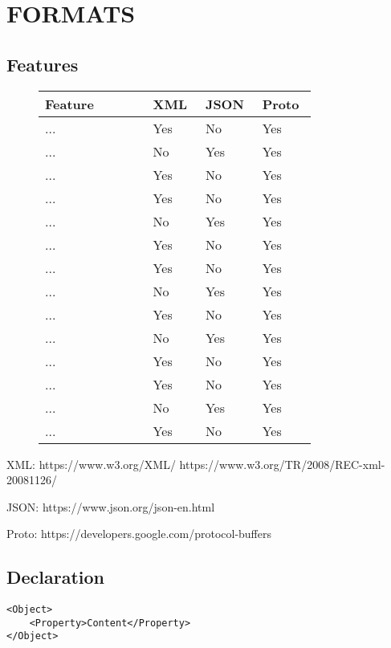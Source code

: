 \documentclass[../report.tex]{subfiles}
\begin{document}
\section{FORMATS} %

\subsection{Features}

\begin{figure}[H]
\def\arraystretch{1.5}
\begin{tabular}{|p{0.35\linewidth}|p{0.15\linewidth}|p{0.15\linewidth}|p{0.15\linewidth}|}
\hline
Feature & XML & JSON & Proto \\
\hline
... & Yes & No & Yes \\ 
... & No & Yes & Yes \\ 
... & Yes & No & Yes \\ 
... & Yes & No & Yes \\ 
... & No & Yes & Yes \\ 
... & Yes & No & Yes \\ 
... & Yes & No & Yes \\ 
... & No & Yes & Yes \\ 
... & Yes & No & Yes \\ 
... & No & Yes & Yes \\ 
... & Yes & No & Yes \\ 
... & Yes & No & Yes \\ 
... & No & Yes & Yes \\ 
... & Yes & No & Yes \\ 
\hline
\end{tabular}
\end{figure}

XML: https://www.w3.org/XML/ https://www.w3.org/TR/2008/REC-xml-20081126/

JSON: https://www.json.org/json-en.html

Proto: https://developers.google.com/protocol-buffers

\subsection{Declaration}

\begin{Verbatim}[frame=single,numbers=right,framesep=5mm,label=XML Object]
<Object>
    <Property>Content</Property>
</Object>
\end{Verbatim}
\end{document}
